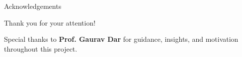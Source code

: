 \documentclass{beamer}
\begin{document}
\begin{frame}{Acknowledgements}
\begin{center}
\Large Thank you for your attention!
\vspace{1cm}

\normalsize
Special thanks to \textbf{Prof. Gaurav Dar} for guidance, insights, and motivation throughout this project.
\end{center}
\end{frame}
\end{document}
